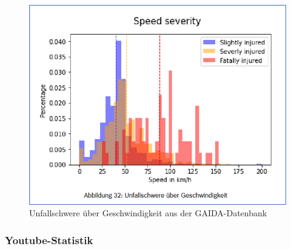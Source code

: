 \begin{figure}[H]
	\centering
	\includegraphics[width=\linewidth]{Bilder/SpeedSeverity.png}
	\caption{Unfallschwere über Geschwindigkeit aus der GAIDA-Datenbank\citep{Maire2020}}
	\label{fig:SpeedSeverity}
\end{figure}


%
%
%

\subsubsection{Youtube-Statistik} %




